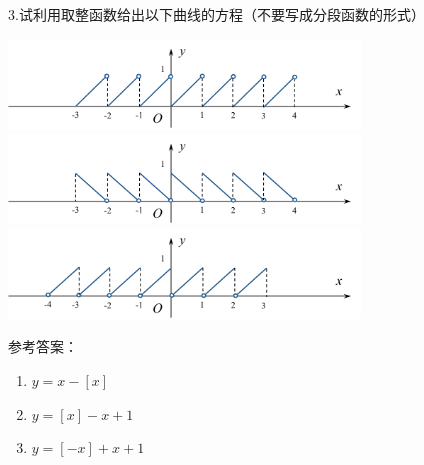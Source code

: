 \bs
3.试利用取整函数给出以下曲线的方程（不要写成分段函数的形式）
  \begin{center}
  	\includegraphics[width=0.7\textwidth]{./images/Ch01/f1.pdf}\\
  	\includegraphics[width=0.7\textwidth]{./images/Ch01/f2.pdf}\\
  	\includegraphics[width=0.7\textwidth]{./images/Ch01/f3.pdf}
  \end{center}

参考答案：
\begin{enumerate}[(1)]
	\setlength{\itemindent}{1cm}
	\item $y=x-[x]$
	\item $y=[x]-x+1$
	\item $y=[-x]+x+1$
\end{enumerate}

